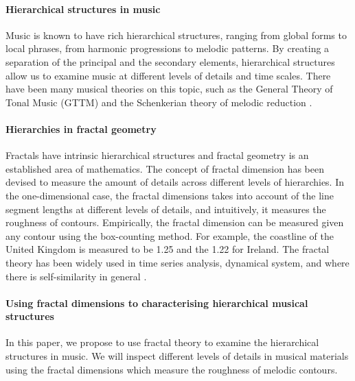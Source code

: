 \documentclass[acmsmall,review,anonymous]{acmart}\settopmatter{printfolios=true,printccs=false,printacmref=false}
\begin{document}

\paragraph{Hierarchical structures in music}
Music is known to have rich hierarchical structures, ranging from global forms to
local phrases, from harmonic progressions to melodic patterns. By
creating a separation of the principal and the secondary elements, hierarchical
structures allow us to examine music at different levels of details and time
scales. There have been many musical theories on this topic, such as the
General Theory of Tonal Music (GTTM) \cite{lerdahl1985generative} and the Schenkerian theory of melodic reduction
\cite{forte1959schenker}.

\paragraph{Hierarchies in fractal geometry}
Fractals have intrinsic
hierarchical structures and fractal geometry is an established area of
mathematics. The
concept of fractal dimension has been devised to measure the amount of details
across different levels of hierarchies. In the one-dimensional case,
the fractal dimensions takes into account of the line segment lengths at
different levels of details, and intuitively, it measures the roughness of
contours. Empirically, the fractal dimension can be measured given any contour
using the box-counting method. For example, the coastline of the United
Kingdom is measured to be 1.25 and the 1.22 for Ireland. The fractal theory has
been widely used in time
series analysis, dynamical system, and where there is self-similarity in
general \cite{accardo1997use, higuchi1988approach}.

\paragraph{Using fractal dimensions to characterising hierarchical musical structures}
In this paper, we propose to use fractal theory to examine the hierarchical
structures in music. We will inspect different levels of details in musical
materials using the fractal dimensions which measure the roughness of melodic contours. 
\end{document}
